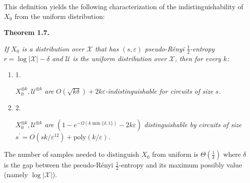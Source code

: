 \documentclass[10pt,a4paper]{article}
\begin{document}



This definition yields the following characterization of the indistinguishability of $X_{0}$ from the uniform distribution:\par





\par\medskip\noindent\textbf{
\textbf{Theorem 1.7}\textbf{.}
}\par



\emph{If $X_{0}$ is a distribution over $\mathcal{X}$ that has $(s,\varepsilon)$ pseudo-Rényi $\frac{1}{2}$-entropy $r=\log|\mathcal{X}|-\delta$ and $\mathcal{U}$ is the uniform distribution over $\mathcal{X}$, then for every $k$:}\par


\begin{enumerate}


\item[] 
1. 


$X_{0}^{\otimes k},\mathcal{U}^{\otimes k}$\emph{ are }$O(\sqrt{k\delta})+2k\varepsilon$\emph{-indistinguishable for circuits of size }$s$\emph{.}\par





\item[] 
2. 


$X_{0}^{\otimes k},\mathcal{U}^{\otimes k}$\emph{ are }$(1-e^{-\Omega(k\min\{\delta,1\})}-2k\varepsilon)$\emph{ distinguishable by circuits of size }$s^{\prime}=O(sk/\varepsilon^{12})+\mathrm{poly}(k/\varepsilon)$\emph{.}\par





\end{enumerate}






The number of samples needed to distinguish $X_{0}$ from uniform is $\Theta\left(\frac{1}{\delta}\right)$ where $\delta$ is the gap between the pseudo-Rényi $\frac{1}{2}$-entropy and its maximum possibly value (namely $\log|\mathcal{X}|$).\par
\end{document}
